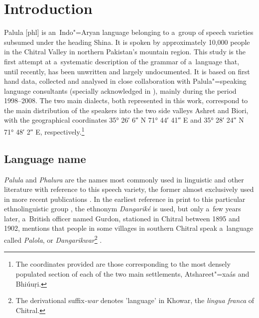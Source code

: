 \chapter{Introduction}
\label{chap:1}

Palula [phl] is an~Indo"=Aryan language belonging to a~group of speech varieties subsumed under the heading
Shina. It is spoken by approximately 10,000 people in the Chitral Valley in northern Pakistan's
mountain region. This study is the first attempt at a~systematic description of the grammar of
a~language that, until recently, has been unwritten and largely undocumented. It is based on first
hand data, collected and analysed in close collaboration with Palula"=speaking language consultants
(specially acknowledged in ), mainly during the period 1998--2008. The two main
dialects, both represented in this work, correspond to the main distribution of the speakers into
the two side valleys Ashret and Biori, with the geographical coordinates 35° 26′ 6″ N 71° 44′ 41″ E and 35° 28′ 24″ N 71° 48′ 2″ E, respectively.\footnote{The coordinates provided are those corresponding to the most densely populated section of each of the two main settlements, Atshareet"=xaás and Bhiúuṛi.}

\section{Language name}
\label{sec:1-1}

\textit{Palula} and \textit{Phalura} are the names most commonly used in linguistic and other
literature with reference to this speech variety, the former almost exclusively used in more recent
publications \citep{cacopardo2001,bashir2003,heegardpetersen2006,schmidtkohistani2008,perder2013,baart2014}. In the earliest reference in print to this particular ethnolinguistic group
\citep[64]{biddulph1986}, the ethnonym \textit{Dangariké} is used, but only a~few years later,
a~British officer named Gurdon, stationed in Chitral between 1895 and 1902, mentions that people in
some villages in southern Chitral speak a~language called \textit{Palola}, or
\textit{Dangarikwar}\footnote{The derivational suffix\textit{-war} denotes 'language' in Khowar, the
  \textit{lingua franca} of Chitral.} \citep{morgenstierne1941}.


